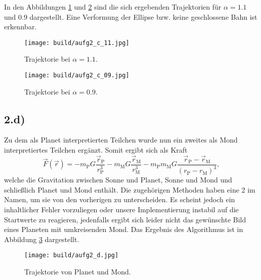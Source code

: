 In den Abbildungen \ref{fig:2_alpha11} und \ref{fig:2_alpha09} sind die sich ergebenden
Trajektorien für $\alpha = \num{1.1}$ und \num{0.9} dargestellt.
Eine Verformung der Ellipse bzw. keine geschlossene Bahn ist erkennbar.
\begin{figure}
    \centering
    \texttt{[image: build/aufg2\_c\_11.jpg]}
    \caption{Trajektorie bei $\alpha = \num{1.1}$.}
    \label{fig:2_alpha11}
\end{figure}
\begin{figure}
    \centering
    \texttt{[image: build/aufg2\_c\_09.jpg]}
    \caption{Trajektorie bei $\alpha = \num{0.9}$.}
    \label{fig:2_alpha09}
\end{figure}

\subsection*{2.d)}
Zu dem als Planet interpretierten Teilchen wurde nun ein zweites als Mond interpretiertes
Teilchen ergänzt.
Somit ergibt sich als Kraft
\begin{equation*}
    \vec{F}\!\left(\vec{r}\right) =
    -m_\text{P} G \frac{\vec{r}_\text{P}}{r_\text{P}^3}
    -m_\text{M} G \frac{\vec{r}_\text{M}}{r_\text{M}^3}
    -m_\text{P} m_\text{M} G \frac{\vec{r}_\text{P}-\vec{r}_\text{M}}{\left(r_\text{P}-r_\text{M}\right)^3}
    ,
\end{equation*}
welche die Gravitation zwischen Sonne und Planet, Sonne und Mond und schließlich
Planet und Mond enthält.
Die zugehörigen Methoden haben eine 2 im Namen, um sie von den vorherigen zu unterscheiden.
Es scheint jedoch ein inhaltlicher Fehler vorzuliegen oder unsere Implementierung instabil
auf die Startwerte zu reagieren, jedenfalls ergibt sich leider nicht das gewünschte
Bild eines Planeten mit umkreisenden Mond.
Das Ergebnis des Algorithmus ist in Abbildung \ref{fig:2_e} dargestellt.
\begin{figure}
    \centering
    \texttt{[image: build/aufg2\_d.jpg]}
    \caption{Trajektorie von Planet und Mond.}
    \label{fig:2_e}
\end{figure}
